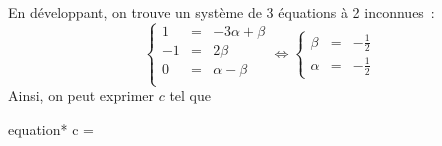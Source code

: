 \documentclass[../main/main.tex]{subfiles}
\begin{document}
{\begin{tcb}[sidebyside]
		En développant, on trouve un système de 3 équations à 2 inconnues~:
		\[ \left\{
			\begin{array}{rcl}
				1  & = & -3\alpha + \beta \\
				-1 & = & 2\beta           \\
				0  & = & \alpha - \beta   \\
			\end{array}
			\right. \Longleftrightarrow \left\{
			\begin{array}{rcl}
				\beta  & = & - \frac{1}{2} \\
				\alpha & = & - \frac{1}{2}
			\end{array}
			\right.\]
		Ainsi, on peut exprimer $c$ tel que
		\begin{empheq}[box=\fbox]{equation*}
			c = 
		\end{empheq}
	\end{tcb}
}
\end{document}
